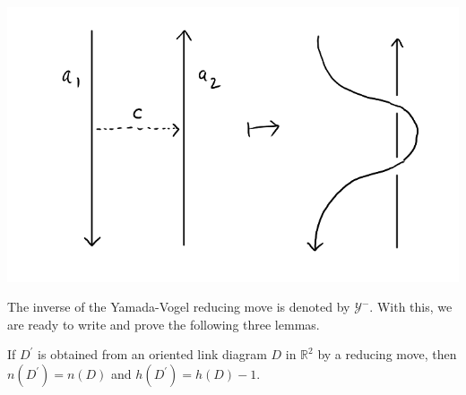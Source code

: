 \begin{center}
  \includegraphics[scale=.25]{images/2.png}
\end{center}
The inverse of the Yamada-Vogel reducing move is denoted by $\mathcal{Y}^-$. With this, we are ready to write and prove the following three lemmas.

\begin{lemma}
    \label{l1}
If $D^{\prime}$ is obtained from an oriented link diagram $D$ in $\mathbb{R}^2$ by a reducing move, then $n(D^{\prime}) = n(D)$ and $h(D^{\prime}) = h(D) - 1$.
\end{lemma}

